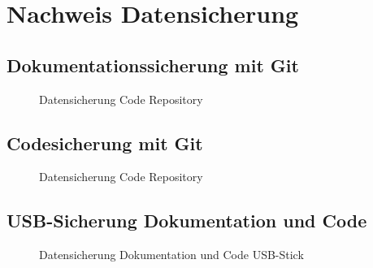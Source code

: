 \newpage

\section{Nachweis Datensicherung}

\subsection{Dokumentationssicherung mit Git}
\begin{figure}[h]
    \centering
    \caption{Datensicherung Code Repository}
 \end{figure}

 \newpage

\subsection{Codesicherung mit Git}
 \begin{figure}[h]
    \centering
    \caption{Datensicherung Code Repository}
 \end{figure}

 \subsection{USB-Sicherung Dokumentation und Code}
 \begin{figure}[h]
    \centering
    \caption{Datensicherung Dokumentation und Code USB-Stick}
 \end{figure}